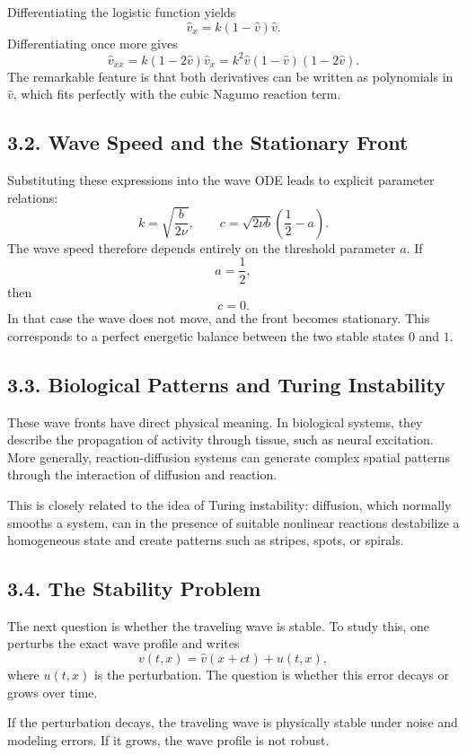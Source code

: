 \documentclass[11pt]{article}
\theoremstyle{definition}
\theoremstyle{remark}
\begin{document}
Differentiating the logistic function yields
\[
\widehat v_x=k(1-\widehat v)\widehat v.
\]
Differentiating once more gives
\[
\widehat v_{xx}=k(1-2\widehat v)\widehat v_x
=
k^2\widehat v(1-\widehat v)(1-2\widehat v).
\]
The remarkable feature is that both derivatives can be written as polynomials in \(\widehat v\), which fits perfectly with the cubic Nagumo reaction term.

\subsection*{3.2. Wave Speed and the Stationary Front}
Substituting these expressions into the wave ODE leads to explicit parameter relations:
\[
k=\sqrt{\frac{b}{2\nu}},
\qquad
c=\sqrt{2\nu b}\left(\frac12-a\right).
\]
The wave speed therefore depends entirely on the threshold parameter \(a\). If
\[
a=\frac12,
\]
then
\[
c=0.
\]
In that case the wave does not move, and the front becomes stationary. This corresponds to a perfect energetic balance between the two stable states \(0\) and \(1\).

\subsection*{3.3. Biological Patterns and Turing Instability}
These wave fronts have direct physical meaning. In biological systems, they describe the propagation of activity through tissue, such as neural excitation. More generally, reaction-diffusion systems can generate complex spatial patterns through the interaction of diffusion and reaction.

This is closely related to the idea of Turing instability: diffusion, which normally smooths a system, can in the presence of suitable nonlinear reactions destabilize a homogeneous state and create patterns such as stripes, spots, or spirals.

\subsection*{3.4. The Stability Problem}
The next question is whether the traveling wave is stable. To study this, one perturbs the exact wave profile and writes
\[
v(t,x)=\widehat v(x+ct)+u(t,x),
\]
where \(u(t,x)\) is the perturbation. The question is whether this error decays or grows over time.

If the perturbation decays, the traveling wave is physically stable under noise and modeling errors. If it grows, the wave profile is not robust.
\end{document}
